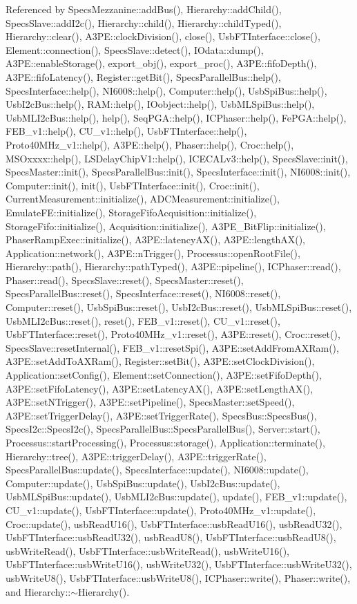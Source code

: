 Referenced by SpecsMezzanine::addBus(), Hierarchy::addChild(), SpecsSlave::addI2c(), Hierarchy::child(), Hierarchy::childTyped(), Hierarchy::clear(), A3PE::clockDivision(), close(), UsbFTInterface::close(), Element::connection(), SpecsSlave::detect(), IOdata::dump(), A3PE::enableStorage(), export\_\-obj(), export\_\-proc(), A3PE::fifoDepth(), A3PE::fifoLatency(), Register::getBit(), SpecsParallelBus::help(), SpecsInterface::help(), NI6008::help(), Computer::help(), UsbSpiBus::help(), UsbI2cBus::help(), RAM::help(), IOobject::help(), UsbMLSpiBus::help(), UsbMLI2cBus::help(), help(), SeqPGA::help(), ICPhaser::help(), FePGA::help(), FEB\_\-v1::help(), CU\_\-v1::help(), UsbFTInterface::help(), Proto40MHz\_\-v1::help(), A3PE::help(), Phaser::help(), Croc::help(), MSOxxxx::help(), LSDelayChipV1::help(), ICECALv3::help(), SpecsSlave::init(), SpecsMaster::init(), SpecsParallelBus::init(), SpecsInterface::init(), NI6008::init(), Computer::init(), init(), UsbFTInterface::init(), Croc::init(), CurrentMeasurement::initialize(), ADCMeasurement::initialize(), EmulateFE::initialize(), StorageFifoAcquisition::initialize(), StorageFifo::initialize(), Acquisition::initialize(), A3PE\_\-BitFlip::initialize(), PhaserRampExec::initialize(), A3PE::latencyAX(), A3PE::lengthAX(), Application::network(), A3PE::nTrigger(), Processus::openRootFile(), Hierarchy::path(), Hierarchy::pathTyped(), A3PE::pipeline(), ICPhaser::read(), Phaser::read(), SpecsSlave::reset(), SpecsMaster::reset(), SpecsParallelBus::reset(), SpecsInterface::reset(), NI6008::reset(), Computer::reset(), UsbSpiBus::reset(), UsbI2cBus::reset(), UsbMLSpiBus::reset(), UsbMLI2cBus::reset(), reset(), FEB\_\-v1::reset(), CU\_\-v1::reset(), UsbFTInterface::reset(), Proto40MHz\_\-v1::reset(), A3PE::reset(), Croc::reset(), SpecsSlave::resetInternal(), FEB\_\-v1::resetSpi(), A3PE::setAddFromAXRam(), A3PE::setAddToAXRam(), Register::setBit(), A3PE::setClockDivision(), Application::setConfig(), Element::setConnection(), A3PE::setFifoDepth(), A3PE::setFifoLatency(), A3PE::setLatencyAX(), A3PE::setLengthAX(), A3PE::setNTrigger(), A3PE::setPipeline(), SpecsMaster::setSpeed(), A3PE::setTriggerDelay(), A3PE::setTriggerRate(), SpecsBus::SpecsBus(), SpecsI2c::SpecsI2c(), SpecsParallelBus::SpecsParallelBus(), Server::start(), Processus::startProcessing(), Processus::storage(), Application::terminate(), Hierarchy::tree(), A3PE::triggerDelay(), A3PE::triggerRate(), SpecsParallelBus::update(), SpecsInterface::update(), NI6008::update(), Computer::update(), UsbSpiBus::update(), UsbI2cBus::update(), UsbMLSpiBus::update(), UsbMLI2cBus::update(), update(), FEB\_\-v1::update(), CU\_\-v1::update(), UsbFTInterface::update(), Proto40MHz\_\-v1::update(), Croc::update(), usbReadU16(), UsbFTInterface::usbReadU16(), usbReadU32(), UsbFTInterface::usbReadU32(), usbReadU8(), UsbFTInterface::usbReadU8(), usbWriteRead(), UsbFTInterface::usbWriteRead(), usbWriteU16(), UsbFTInterface::usbWriteU16(), usbWriteU32(), UsbFTInterface::usbWriteU32(), usbWriteU8(), UsbFTInterface::usbWriteU8(), ICPhaser::write(), Phaser::write(), and Hierarchy::$\sim$Hierarchy().


